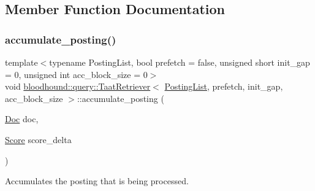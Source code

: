 \subsection{Member Function Documentation}
\mbox{\label{classbloodhound_1_1query_1_1TaatRetriever_aa9812dfbf0f5ec7fc7668abe22774929}} 
\subsubsection{\texorpdfstring{accumulate\+\_\+posting()}{accumulate\_posting()}}
{\footnotesize\ttfamily template$<$typename Posting\+List, bool prefetch = false, unsigned short init\+\_\+gap = 0, unsigned int acc\+\_\+block\+\_\+size = 0$>$ \\
void \hyperlink{classbloodhound_1_1query_1_1TaatRetriever}{bloodhound\+::query\+::\+Taat\+Retriever}$<$ \hyperlink{classbloodhound_1_1PostingList}{Posting\+List}, prefetch, init\+\_\+gap, acc\+\_\+block\+\_\+size $>$\+::accumulate\+\_\+posting (\begin{DoxyParamCaption}\item[{\hyperlink{structbloodhound_1_1Doc}{Doc}}]{doc,  }\item[{\hyperlink{structbloodhound_1_1Score}{Score}}]{score\+\_\+delta }\end{DoxyParamCaption})\hspace{0.3cm}{\ttfamily [inline]}}



Accumulates the posting that is being processed. 

\mbox{\label{classbloodhound_1_1query_1_1TaatRetriever_a7f631f87075249c768873d15a59956c5}} 
